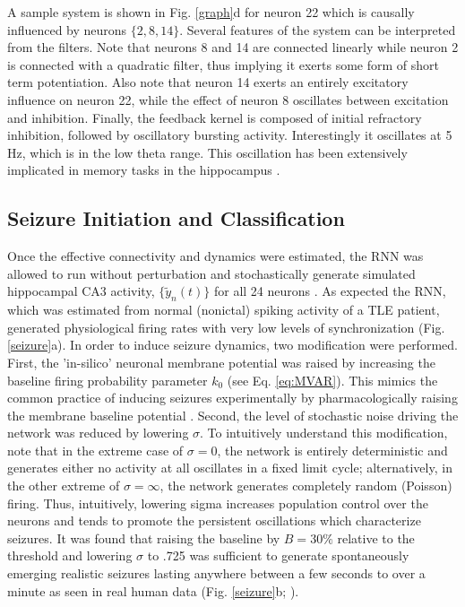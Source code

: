 \documentclass[journal,twoside,web]{ieeecolor}
\newcommand{\nn}{24}    %
\begin{document}
A sample system is shown in Fig. \ref{graph}d for neuron 22 which is causally influenced by neurons $\{2,8,14\}$.
Several features of the system can be interpreted from the filters.
Note that neurons 8 and 14 are connected linearly while neuron 2 is connected with a quadratic filter, thus implying it exerts some form of short term potentiation.
Also note that neuron 14 exerts an entirely excitatory influence on neuron 22, while the effect of neuron 8 oscillates between excitation and inhibition.
Finally, the feedback kernel is composed of initial refractory inhibition, followed by oscillatory bursting activity.
Interestingly it oscillates at 5 Hz, which is in the low theta range. 
This oscillation has been extensively implicated in memory tasks in the hippocampus \cite{buzsaki06,sandler14}.

    \subsection{Seizure Initiation and Classification}

Once the effective connectivity and dynamics were estimated, the RNN was allowed to run without perturbation and stochastically generate simulated hippocampal CA3 activity, $\{\tilde{y}_n(t)\}$ for all \nn{} neurons \cite{pillow08}.
As expected the RNN, which was estimated from normal (nonictal) spiking activity of a TLE patient, generated physiological firing rates with very low levels of synchronization (Fig. \ref{seizure}a).
In order to induce seizure dynamics, two modification were performed.
First, the 'in-silico' neuronal membrane potential was raised by increasing the baseline firing probability parameter $k_0$ (see Eq. \ref{eq:MVAR}).
This mimics the common practice of inducing seizures experimentally by pharmacologically raising the membrane baseline potential \cite{fricker99,avoli02}.
Second, the level of stochastic noise driving the network was reduced by lowering $\sigma$.
To intuitively understand this modification, note that in the extreme case of $\sigma=0$, the network is entirely deterministic and generates either no activity at all oscillates in a fixed limit cycle;
alternatively, in the other extreme of $\sigma=\infty$, the network generates completely random (Poisson) firing.
Thus, intuitively, lowering sigma increases population control over the neurons and tends to promote the persistent oscillations which characterize seizures.
It was found that raising the baseline by $B=30\%$ relative to the threshold and lowering $\sigma$ to .725 was sufficient to generate spontaneously emerging realistic seizures lasting anywhere between a few seconds to over a minute as seen in real human data (Fig. \ref{seizure}b; \cite{bower12,truccolo14}).	
\end{document}
